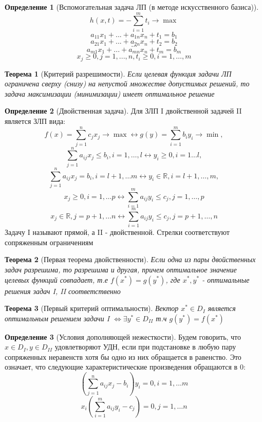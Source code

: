 \documentclass[a4paper]{article}
\newtheorem{theorem}{Теорема}[section]
\theoremstyle{definition}
\newtheorem*{definition}{Определение}
\theoremstyle{remark}
\begin{document}
\begin{definition}[Вспомогательная задача ЛП (в методе искусственного базиса)]
	\[h(x, t) = -\sum_{i = 1}^m t_i\to \max\]
	\[a_{11}x_1 + ... + a_{1n}x_n + t_1 = b_1\]
	\[a_{21}x_1 + ... + a_{2n}x_n + t_2 = b_2\]
	\[\dots\]
	\[a_{m1}x_1 + ... + a_{mn}x_n + t_m = b_m\]
	\[x_j\ge 0, j = 1, ..., n, t_i\ge 0, i = 1, \dots, m\]
\end{definition}
\begin{theorem}[Критерий разрешимости]
    Если целевая функция задачи ЛП ограничена сверху (снизу) на непустой множестве 
	допустимых решений, то задача максимизации (минимизации) имеет оптимальное 
	решение
\end{theorem}
\begin{definition}[Двойственная задача]
    Для ЗЛП I двойственной задачей II является ЗЛП вида:
        $$f(x) = \sum_{j = 1}^n c_j x_j \to \max \leftrightarrow g(y) = \sum_{i = 1}^m b_i y_i\to \min,$$
        $$\sum_{j = 1}^n a_{ij} x_j \leq b_i, i = 1, \dots, l \leftrightarrow y_i\geq 0, i = 1...l,$$
        $$\sum_{j = 1}^n a_{ij} x_j = b_i, i = l+1, \dots m \leftrightarrow y_i\in \mathbb{R}, i = l+1, \dots, m,$$
        $$x_j\geq 0, i = 1, \dots p\leftrightarrow \sum_{i = 1}^m a_{ij} y_i \leq c_j, j = 1, \dots, p$$
        $$x_j \in \mathbb{R}, j = p+1, \dots n \leftrightarrow \sum_{i = 1}^m a_{ij} y_i \leq c_j, j = p+1, \dots, n$$
        Задачу I называют прямой, а II - двойственной. Стрелки соответствуют сопряженным ограничениям
\end{definition}
\begin{theorem}[Первая теорема двойственности]
    Если одна из пары двойственных задач разрешима, то разрешима и другая, причем оптимальное значение целевых функций совпадает, т.е $f(x^*) = g(y^*)$, где $x^*, y^*$ - оптимальные решения задач I, II соответственно
\end{theorem}
\begin{theorem}[Первый критерий оптимальности]
    Вектор $x^* \in D_I$ является оптимальным решением задачи 
    I $\Leftrightarrow \exists y^* \in D_{II}$ т.ч  $g(y^*) = f(x^*)$    
\end{theorem}
\begin{definition}[Условия дополняющей нежесткости]
    Будем говорить, что $x\in D_I, y \in D_{II}$ удовлетворяют УДН, если при подстановке в любую пару сопряженных неравенств хотя бы одно из них обращается в равенство. Это означает, что следующие характеристические произведения обращаются в 0:
    \[(\sum_{j = 1}^n a_{ij}x_j - b_i)y_i = 0, i  = 1, \dots m\]
    \[x_i (\sum_{i = 1}^m a_{ij}y_i - c_j) = 0, j = 1, \dots n\]
\end{definition}
\end{document}
